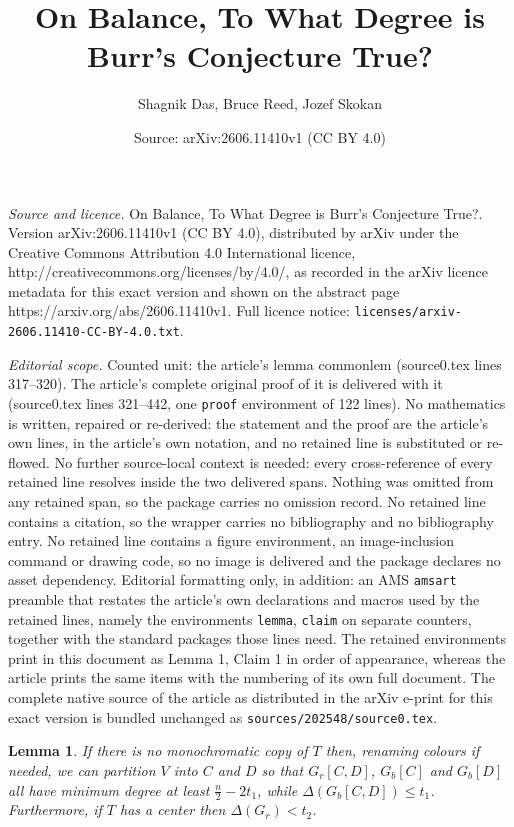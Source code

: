\documentclass[10pt,a4paper]{amsart}
\title{On Balance, To What Degree is Burr's Conjecture True?}
\author{Shagnik Das, Bruce Reed, Jozef Skokan}
\date{Source: arXiv:2606.11410v1 (CC BY 4.0)}
\newtheorem{lemma}{Lemma}
\begin{document}
\maketitle

\noindent\emph{Source and licence.} On Balance, To What Degree is Burr's Conjecture True?. Version arXiv:2606.11410v1 (CC BY 4.0), distributed by arXiv under the Creative Commons Attribution 4.0 International licence, http://creativecommons.org/licenses/by/4.0/, as recorded in the arXiv licence metadata for this exact version and shown on the abstract page https://arxiv.org/abs/2606.11410v1. Full licence notice: \texttt{licenses/arxiv-2606.11410-CC-BY-4.0.txt}.\par\smallskip

\noindent\textit{Editorial scope.} Counted unit: the article's lemma commonlem (source0.tex lines 317--320). The article's complete original proof of it is delivered with it (source0.tex lines 321--442, one \texttt{proof} environment of 122 lines). No mathematics is written, repaired or re-derived: the statement and the proof are the article's own lines, in the article's own notation, and no retained line is substituted or re-flowed.  No further source-local context is needed: every cross-reference of every retained line resolves inside the two delivered spans.  Nothing was omitted from any retained span, so the package carries no omission record.  No retained line contains a citation, so the wrapper carries no bibliography and no bibliography entry.  No retained line contains a figure environment, an image-inclusion command or drawing code, so no image is delivered and the package declares no asset dependency.  Editorial formatting only, in addition: an AMS \texttt{amsart} preamble that restates the article's own declarations and macros used by the retained lines, namely the environments \texttt{lemma}, \texttt{claim} on separate counters, together with the standard packages those lines need.  The retained environments print in this document as Lemma 1, Claim 1 in order of appearance, whereas the article prints the same items with the numbering of its own full document.  The complete native source of the article as distributed in the arXiv e-print for this exact version is bundled unchanged as \texttt{sources/202548/source0.tex}.
\begin{lemma}
\label{commonlem}
    If there is no monochromatic copy of $T$ then, renaming colours if needed, we can partition $V$ into $C$ and $D$ so that $G_r[C,D]$, $G_b[C]$ and $G_b[D]$ all have minimum degree at least $\frac{n}{2}-2t_1$, while $\Delta(G_b[C,D]) \le t_1$. Furthermore, if $T$ has a center then $\Delta(G_r)<t_2$. 
\end{lemma}
\end{document}
